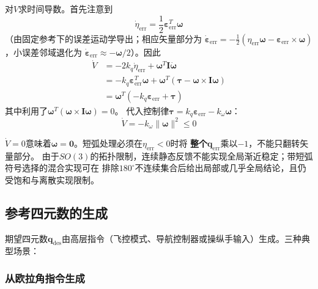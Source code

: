 对$V$求时间导数。首先注意到
\begin{equation}
    \dot{\eta}_{\text{err}} = \frac{1}{2}\boldsymbol{\varepsilon}_{\text{err}}^T \boldsymbol{\omega}
    \label{eq:eta_dot}
\end{equation}
（由固定参考下的误差运动学导出；相应矢量部分为
$\dot{\boldsymbol\varepsilon}_{\mathrm{err}}
=-\tfrac12(\eta_{\mathrm{err}}\boldsymbol\omega-
\boldsymbol\varepsilon_{\mathrm{err}}\times\boldsymbol\omega)$，小误差邻域退化为
$\dot{\boldsymbol\varepsilon}_{\mathrm{err}}\approx-\boldsymbol\omega/2$）。因此
\begin{align}
    \dot{V} &= -2k_q\dot{\eta}_{\text{err}} + \boldsymbol{\omega}^T \mathbf{I} \dot{\boldsymbol{\omega}} \nonumber \\
            &= -k_q \boldsymbol{\varepsilon}_{\text{err}}^T \boldsymbol{\omega} + \boldsymbol{\omega}^T(\boldsymbol{\tau} - \boldsymbol{\omega}\times\mathbf{I}\boldsymbol{\omega}) \nonumber \\
            &= \boldsymbol{\omega}^T(-k_q \boldsymbol{\varepsilon}_{\text{err}} + \boldsymbol{\tau}) \label{eq:Vdot_intermediate}
\end{align}
其中利用了$\boldsymbol{\omega}^T(\boldsymbol{\omega}\times\mathbf{I}\boldsymbol{\omega})=0$。
代入控制律$\boldsymbol\tau=k_q\boldsymbol\varepsilon_{\mathrm{err}}-k_\omega\boldsymbol\omega$：
\begin{equation}
    \boxed{\dot{V} = -k_\omega \|\boldsymbol{\omega}\|^2 \leq 0}
    \label{eq:Vdot_final}
\end{equation}

$\dot V=0$意味着$\boldsymbol\omega=\mathbf0$。短弧处理必须在$\eta_{\mathrm{err}}<0$时将
\textbf{整个}$\mathbf q_{\mathrm{err}}$乘以$-1$，不能只翻转矢量部分。
由于$SO(3)$的拓扑限制，连续静态反馈不能实现全局渐近稳定；带短弧符号选择的混合实现可在
排除$180^\circ$不连续集合后给出局部或几乎全局结论，且仍受饱和与离散实现限制。

\subsection{参考四元数的生成}

期望四元数$\mathbf{q}_{\text{des}}$由高层指令（飞控模式、导航控制器或操纵手输入）生成。三种典型场景：

\subsubsection{从欧拉角指令生成}

